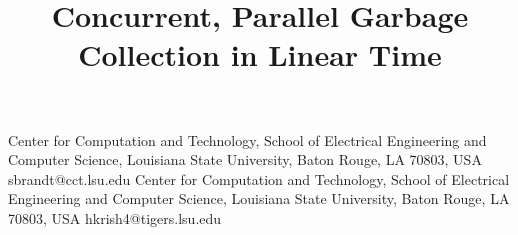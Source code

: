 \setlength{\pdfpageheight}{\paperheight}
\setlength{\pdfpagewidth}{\paperwidth}



\title{Concurrent, Parallel Garbage Collection in Linear Time}
  {Center for Computation and Technology, School of Electrical Engineering and Computer Science, Louisiana State University, Baton Rouge, LA 70803, USA} {sbrandt@cct.lsu.edu}
  {Center for Computation and Technology, School of Electrical Engineering and Computer Science, Louisiana State University, Baton Rouge, LA 70803, USA} {hkrish4@tigers.lsu.edu}

\maketitle

